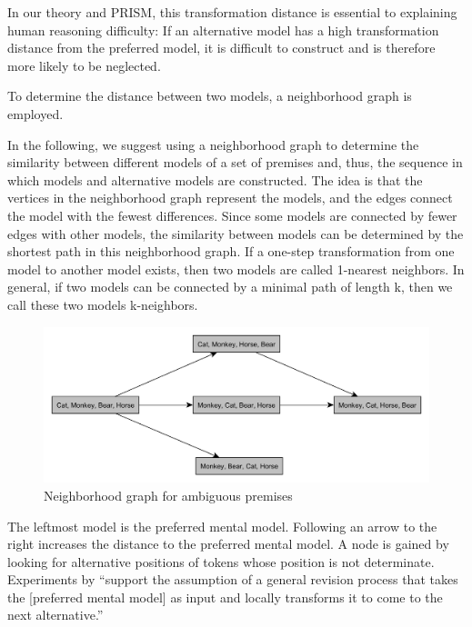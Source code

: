 \documentclass[hidelinks]{scrartcl}
\begin{document}
\begin{displayquote}
In our theory and PRISM, this transformation distance is essential to explaining human reasoning difficulty: If an alternative model has a high transformation distance from the preferred model, it is difficult to construct and is therefore more likely to be neglected. \\
\citep{Ragni.2013}
\end{displayquote}

\noindent To determine the distance between two models, a neighborhood graph is employed.
\begin{displayquote}
In the following, we suggest using a neighborhood graph to determine the similarity between different models of a set of \gls{premise}s and, thus, the sequence in which models and alternative models are constructed. The idea is that the vertices in the neighborhood graph represent the models, and the edges connect the model with the fewest differences. Since some models are connected by fewer edges with other models, the similarity between models can be determined by the shortest path in this neighborhood graph. If a one-step transformation from one model to another model exists, then two models are called 1-nearest neighbors. In general, if two models can be connected by a minimal path of length k, then we call these two models k-neighbors. \\
\citep{Ragni.2013}
\end{displayquote}

\begin{figure}[!ht]
	\caption{Neighborhood graph for ambiguous premises}
	\label{img:neighborhood_graph}
	\centering
	\includegraphics[width=1\textwidth]{Illustrations/neighborhood_graph.png}
\end{figure}

The leftmost model is the preferred mental model. Following an arrow to the right increases the distance to the preferred mental model. A node is gained by looking for alternative positions of tokens whose position is not determinate. Experiments by \cite{Rauh.2005} ``support the assumption of a general revision process that takes the [preferred mental model] as input and locally transforms it to come to the next alternative.''
\end{document}
